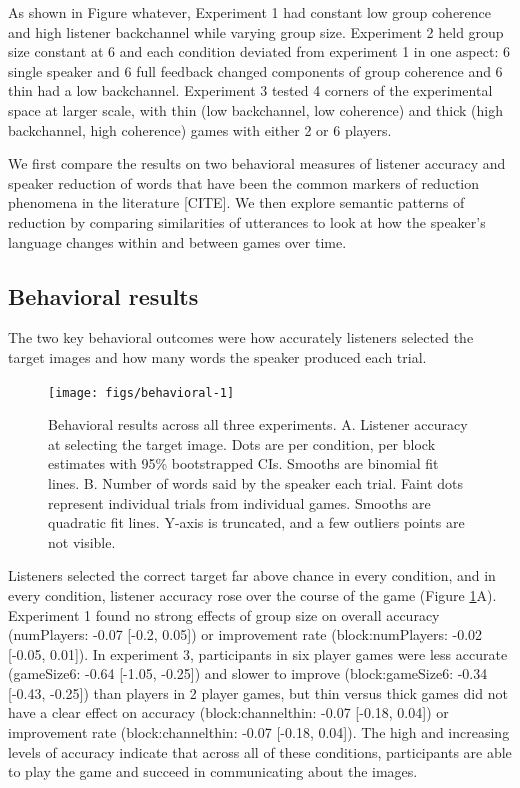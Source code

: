 \documentclass[
  english,
  a4paper,
]{article}
\begin{document}
As shown in Figure whatever, Experiment 1 had constant low group coherence and high listener backchannel while varying group size. Experiment 2 held group size constant at 6 and each condition deviated from experiment 1 in one aspect: 6 single speaker and 6 full feedback changed components of group coherence and 6 thin had a low backchannel. Experiment 3 tested 4 corners of the experimental space at larger scale, with thin (low backchannel, low coherence) and thick (high backchannel, high coherence) games with either 2 or 6 players.

We first compare the results on two behavioral measures of listener accuracy and speaker reduction of words that have been the common markers of reduction phenomena in the literature {[}CITE{]}. We then explore semantic patterns of reduction by comparing similarities of utterances to look at how the speaker's language changes within and between games over time.

\hypertarget{behavioral-results}{%
\subsection{Behavioral results}\label{behavioral-results}}

The two key behavioral outcomes were how accurately listeners selected the target images and how many words the speaker produced each trial.

\begin{figure}[t!]

{\centering \texttt{[image: figs/behavioral-1]} 

}

\caption{Behavioral results across all three experiments. A. Listener accuracy at selecting the target image. Dots are per condition, per block estimates with 95\% bootstrapped CIs. Smooths are binomial fit lines. B. Number of words said by the speaker each trial. Faint dots represent individual trials from individual games. Smooths are quadratic fit lines. Y-axis is truncated, and a few outliers points are not visible. }\label{fig:behavioral}
\end{figure}

Listeners selected the correct target far above chance in every condition, and in every condition, listener accuracy rose over the course of the game (Figure \ref{fig:behavioral}A). Experiment 1 found no strong effects of group size on overall accuracy (numPlayers: -0.07 {[}-0.2, 0.05{]}) or improvement rate (block:numPlayers: -0.02 {[}-0.05, 0.01{]}). In experiment 3, participants in six player games were less accurate (gameSize6: -0.64 {[}-1.05, -0.25{]}) and slower to improve (block:gameSize6: -0.34 {[}-0.43, -0.25{]}) than players in 2 player games, but thin versus thick games did not have a clear effect on accuracy (block:channelthin: -0.07 {[}-0.18, 0.04{]}) or improvement rate (block:channelthin: -0.07 {[}-0.18, 0.04{]}). The high and increasing levels of accuracy indicate that across all of these conditions, participants are able to play the game and succeed in communicating about the images.
\end{document}
